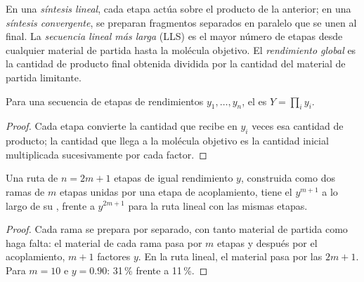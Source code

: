 \begin{definition}\label{def:b3:total-synthesis:architecture}
En una \emph{síntesis lineal}, cada etapa actúa sobre el
producto de la anterior; en una \emph{síntesis convergente},
se preparan fragmentos separados en paralelo que se unen al final. La
\emph{secuencia lineal más larga} (LLS) es el
mayor número de etapas desde cualquier material de partida hasta la molécula objetivo. El
\emph{rendimiento global} es la cantidad de producto final obtenida
dividida por la cantidad del material de partida limitante.
\end{definition}

\begin{proposition}\label{prop:b3:total-synthesis:overall-yield}
Para una secuencia de etapas de rendimientos $y_1, \dots, y_n$, el  es $Y = \prod_i y_i$.
\end{proposition}

\begin{proof}
Cada etapa convierte la cantidad que recibe en $y_i$ veces esa cantidad de producto; la
cantidad que llega a la molécula objetivo es la cantidad inicial multiplicada sucesivamente por cada
factor.
\end{proof}

\begin{proposition}[Convergencia]\label{prop:b3:total-synthesis:convergent}
Una ruta de $n = 2m + 1$ etapas de igual rendimiento $y$, construida como dos ramas de $m$ etapas unidas por
una etapa de acoplamiento, tiene el  $y^{m+1}$ a lo largo de su ,
frente a $y^{2m+1}$ para la ruta lineal con las mismas etapas.
\end{proposition}

\begin{proof}
Cada rama se prepara por separado, con tanto material de partida como haga falta: el
material de cada rama pasa por $m$ etapas y después por el acoplamiento, $m + 1$
factores $y$. En la ruta lineal, el material pasa por las $2m + 1$. Para $m = 10$
e $y = 0.90$: 31\,\% frente a 11\,\%.
\end{proof}

